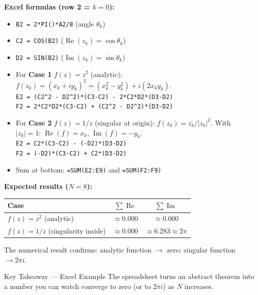 \documentclass[12pt,a4paper]{article}
\begin{document}
\medskip
\noindent\textbf{Excel formulas (row 2 = $k=0$):}
\begin{itemize}
  \item \texttt{B2 = 2*PI()*A2/8} \hfill (angle $\theta_k$)
  \item \texttt{C2 = COS(B2)} \hfill ($\operatorname{Re}(z_k) = \cos\theta_k$)
  \item \texttt{D2 = SIN(B2)} \hfill ($\operatorname{Im}(z_k) = \sin\theta_k$)
  \item For \textbf{Case 1} $f(z)=z^2$ (analytic):
        $f(z_k) = (x_k + iy_k)^2 = (x_k^2 - y_k^2) + i(2x_k y_k)$.\\
        \texttt{E2 = (C2\^{}2 - D2\^{}2)*(C3-C2) - 2*C2*D2*(D3-D2)}\\
        \texttt{F2 = 2*C2*D2*(C3-C2) + (C2\^{}2 - D2\^{}2)*(D3-D2)}
  \item For \textbf{Case 2} $f(z)=1/z$ (singular at origin):
        $f(z_k) = \overline{z_k}/|z_k|^2$.
        With $|z_k|=1$: $\operatorname{Re}(f)=x_k$, $\operatorname{Im}(f)=-y_k$.\\
        \texttt{E2 = C2*(C3-C2) - (-D2)*(D3-D2)}\\
        \texttt{F2 = (-D2)*(C3-C2) + C2*(D3-D2)}
  \item Sum at bottom: \texttt{=SUM(E2:E9)} and \texttt{=SUM(F2:F9)}
\end{itemize}

\medskip
\noindent\textbf{Expected results ($N=8$):}

\begin{center}
\begin{tabular}{lcc}
\toprule
\textbf{Case} & $\sum \operatorname{Re}$ & $\sum \operatorname{Im}$ \\
\midrule
$f(z)=z^2$ (analytic) & $\approx 0.000$ & $\approx 0.000$ \\
$f(z)=1/z$ (singularity inside) & $\approx 0.000$ & $\approx 6.283 \approx 2\pi$ \\
\bottomrule
\end{tabular}
\end{center}

The numerical result confirms: analytic function $\to$ zero; singular function $\to 2\pi i$.

\begin{learnbox}{Key Takeaway --- Excel Example}
The spreadsheet turns an abstract theorem into a number you can watch converge to zero
(or to $2\pi i$) as $N$ increases.
\end{learnbox}
\end{document}
